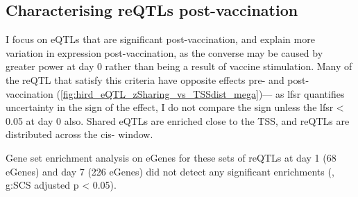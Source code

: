 
\subsection{Characterising reQTLs post-vaccination}

I focus on \glspl{eQTL} that are significant post-vaccination, and explain more variation in expression post-vaccination, as the converse may be caused by greater power at day 0 rather than being a result of vaccine stimulation.
Many of the \gls{reQTL} that satisfy this criteria have opposite effects pre- and post-vaccination (\autoref{fig:hird_eQTL_zSharing_vs_TSSdist_mega})---
as lfsr quantifies uncertainty in the sign of the effect, I do not compare the sign unless the lfsr < 0.05 at day 0 also.
Shared \glspl{eQTL} are enriched close to the \gls{TSS}, and \glspl{reQTL} are distributed across the cis- window.

Gene set enrichment analysis on eGenes for these sets of \glspl{reQTL} at day 1 (68 eGenes) and day 7 (226 eGenes) did not detect any significant enrichments (, g:SCS adjusted p < 0.05).

%

%

